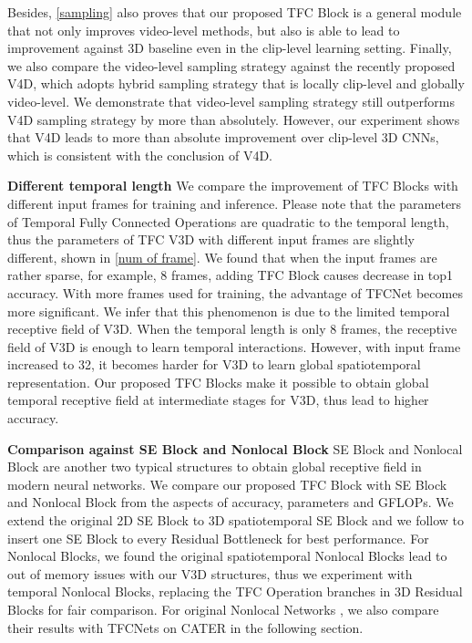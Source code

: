 \documentclass[nohyperref]{article}
\theoremstyle{plain}
\theoremstyle{definition}
\theoremstyle{remark}
\begin{document}
{{Besides, \cref{sampling} also proves that our proposed TFC Block is a general module that not only improves video-level methods, but also is  able to lead to  improvement against 3D baseline even in the clip-level learning setting. Finally, we also compare the video-level sampling strategy against the recently proposed V4D\cite{Zhang2020V4D:}, which adopts hybrid sampling strategy that is locally clip-level and globally video-level. We demonstrate that video-level sampling strategy still outperforms V4D sampling strategy by more than  absolutely. However, our experiment shows that V4D leads to more than  absolute improvement over clip-level 3D CNNs, which is consistent with the conclusion of V4D.


{\bf Different temporal length} We compare the improvement of TFC Blocks with different input frames for training and inference. Please note that the parameters of Temporal Fully Connected Operations are quadratic to the temporal length, thus the parameters of TFC V3D with different input frames are slightly different, shown in \cref{num of frame}. We found that when the input frames are rather sparse, for example, 8 frames, adding TFC Block causes decrease in top1 accuracy. With more frames used for training, the advantage of TFCNet becomes more significant. We infer that this phenomenon is due to the limited temporal receptive field of V3D. When the temporal length is only 8 frames, the receptive field of V3D is enough to learn temporal interactions. However, with input frame increased to 32, it becomes harder for V3D to learn global spatiotemporal representation. Our proposed TFC Blocks make it possible to obtain global temporal receptive field at intermediate stages for V3D, thus lead to higher accuracy.


{\bf Comparison against SE Block and Nonlocal Block} SE Block and Nonlocal Block are another two typical structures to obtain global receptive field in modern neural networks. We compare our proposed TFC Block with SE Block and Nonlocal Block from the aspects of accuracy, parameters and GFLOPs. We extend the original 2D SE Block to 3D spatiotemporal SE Block and we follow \cite{Hu_2018_CVPR} to insert one SE Block to every Residual Bottleneck for best performance. For Nonlocal Blocks, we found the original spatiotemporal Nonlocal Blocks\cite{DBLP:conf/cvpr/0004GGH18} lead to out of memory issues with our V3D structures, thus we experiment with temporal Nonlocal Blocks, replacing the TFC Operation branches in 3D Residual Blocks for fair comparison. For original Nonlocal Networks \cite{DBLP:conf/cvpr/0004GGH18}, we also compare their results with TFCNets on CATER in the following section.


}}
\end{document}
